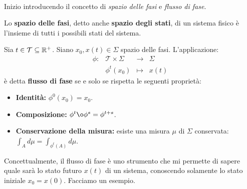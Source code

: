 \paragraph {}
Inizio introducendo il concetto di \emph{spazio delle fasi} e \emph{flusso di fase}.

\begin{definition}
    Lo \textbf{spazio delle fasi}, detto anche \textbf{spazio degli stati}, di
    un sistema fisico è l'insieme di tutti i possibili stati del sistema.
\end{definition}

\begin{definition}
    Sia $t \in \mathcal T \subseteq \mathbb{R}^+$. Siano $x_0, x(t) \in \Sigma$ spazio delle fasi.
    L'applicazione: \\
    \begin{equation*}
        \begin{array}{cccc}%
            \phi: &\mathcal T \times \Sigma &\to &\Sigma \\
            &\phi^t(x_0) &\mapsto &x(t)
        \end{array}%
    \end{equation*}
    è detta \textbf{flusso di fase} se e solo se rispetta le seguenti proprietà:
    \begin{itemize}
        \item \textbf{Identità:} $\phi^0(x_0) = x_0$.
        \item \textbf{Composizione:} $\phi^t \o \phi^s = \phi^{t+s}$.
        \item \textbf{Conservazione della misura:} esiste una misura $\mu$ di $\Sigma$ %
        conservata: $\int_A d\mu = \int_{\phi^t(A)} d\mu$.
    \end{itemize}
\end{definition}

Concettualmente, il flusso di fase è uno strumento che mi permette di sapere
quale sarà lo stato futuro $x(t)$ di un sistema, conoscendo solamente lo stato
iniziale $x_0 = x(0)$.
Facciamo un esempio.

